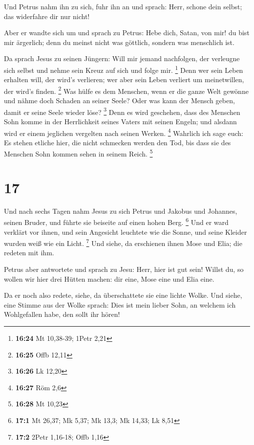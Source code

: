  Und Petrus nahm ihn zu sich, fuhr ihn an und sprach: Herr,
schone dein selbst; das widerfahre dir nur nicht!

 Aber er wandte sich um und sprach zu Petrus: Hebe dich,
Satan, von mir! du bist mir ärgerlich; denn du meinst nicht was
göttlich, sondern was menschlich ist.

 Da sprach Jesus zu seinen Jüngern: Will mir jemand
nachfolgen, der verleugne sich selbst und nehme sein Kreuz auf sich und
folge mir. \footnote{\textbf{16:24} Mt 10,38-39; 1Petr 2,21}
 Denn wer sein Leben erhalten will, der wird's verlieren;
wer aber sein Leben verliert um meinetwillen, der wird's finden.
\footnote{\textbf{16:25} Offb 12,11}  Was hülfe es dem
Menschen, wenn er die ganze Welt gewönne und nähme doch Schaden an
seiner Seele? Oder was kann der Mensch geben, damit er seine Seele
wieder löse? \footnote{\textbf{16:26} Lk 12,20}  Denn es
wird geschehen, dass des Menschen Sohn komme in der Herrlichkeit seines
Vaters mit seinen Engeln; und alsdann wird er einem jeglichen vergelten
nach seinen Werken. \footnote{\textbf{16:27} Röm 2,6} 
Wahrlich ich sage euch: Es stehen etliche hier, die nicht schmecken
werden den Tod, bis dass sie des Menschen Sohn kommen sehen in seinem
Reich. \footnote{\textbf{16:28} Mt 10,23}

\hypertarget{section-10}{%
\section{17}\label{section-10}}

 Und nach sechs Tagen nahm Jesus zu sich Petrus und Jakobus
und Johannes, seinen Bruder, und führte sie beiseite auf einen hohen
Berg. \footnote{\textbf{17:1} Mt 26,37; Mk 5,37; Mk 13,3; Mk 14,33; Lk
  8,51}  Und er ward verklärt vor ihnen, und sein Angesicht
leuchtete wie die Sonne, und seine Kleider wurden weiß wie ein Licht.
\footnote{\textbf{17:2} 2Petr 1,16-18; Offb 1,16}  Und
siehe, da erschienen ihnen Mose und Elia; die redeten mit ihm.

 Petrus aber antwortete und sprach zu Jesu: Herr, hier ist
gut sein! Willst du, so wollen wir hier drei Hütten machen: dir eine,
Mose eine und Elia eine.

 Da er noch also redete, siehe, da überschattete sie eine
lichte Wolke. Und siehe, eine Stimme aus der Wolke sprach: Dies ist mein
lieber Sohn, an welchem ich Wohlgefallen habe, den sollt ihr hören!

